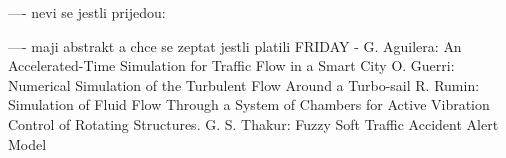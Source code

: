 \documentclass[10pt, A4]{article}%
\begin{document}
---- nevi se jestli prijedou:

---- maji abstrakt a chce se zeptat jestli platili
FRIDAY - {G. Aguilera}: {An Accelerated-Time Simulation for Traffic Flow in a Smart City}
{O. Guerri}: {Numerical Simulation of the Turbulent Flow Around a Turbo-sail}
{R. Rumin}: {Simulation of Fluid Flow Through a System of Chambers for Active Vibration Control of Rotating Structures.}
{G. S. Thakur}: {Fuzzy Soft Traffic Accident Alert Model}
\end{document}

